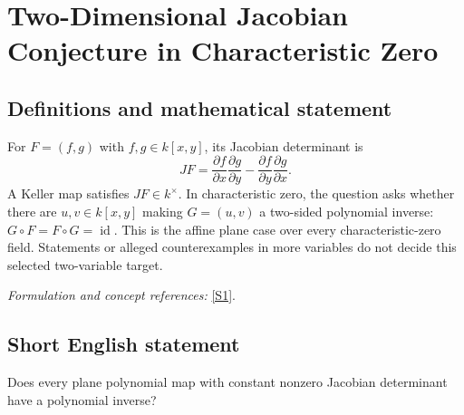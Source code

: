 \documentclass[11pt]{article}
\newcommand{\sref}[2]{\hyperlink{source:#1:#2}{[S#2]}}
\newif\ifshowcatalogue
\newcommand{\cataloguescope}[1]{\ifshowcatalogue
 \paragraph{Exact scope in the supplied catalogue.}
 \begin{quote}\small #1\end{quote}\fi}
\begin{document}
\setcounter{section}{0}
\clearpage
\section*{\texorpdfstring{Two-Dimensional Jacobian Conjecture in Characteristic Zero}{Two-Dimensional Jacobian Conjecture in Characteristic Zero}}\label{statement}
\subsection{Definitions and mathematical statement}
For $F=(f,g)$ with $f,g\in k[x,y]$, its Jacobian determinant is
\[
 JF=\frac{\partial f}{\partial x}\frac{\partial g}{\partial y}
       -\frac{\partial f}{\partial y}\frac{\partial g}{\partial x}.
\]
A Keller map satisfies $JF\in k^\times$. In characteristic zero, the question asks whether there are $u,v\in k[x,y]$ making $G=(u,v)$ a two-sided polynomial inverse: $G\circ F=F\circ G=\operatorname{id}$. This is the affine plane case over every characteristic-zero field. Statements or alleged counterexamples in more variables do not decide this selected two-variable target.
\par\smallskip\textit{Formulation and concept references:} \sref{statement}{1}.
\cataloguescope{Let k be a field of characteristic zero and let F:k\textasciicircum{}2 -> k\textasciicircum{}2 be a polynomial map whose Jacobian determinant is a nonzero constant. Determine whether F must have a polynomial inverse, equivalently whether every two-variable Keller map is a polynomial automorphism of the affine plane.}
\subsection{Short English statement}
Does every plane polynomial map with constant nonzero Jacobian determinant have a polynomial inverse?
\end{document}

